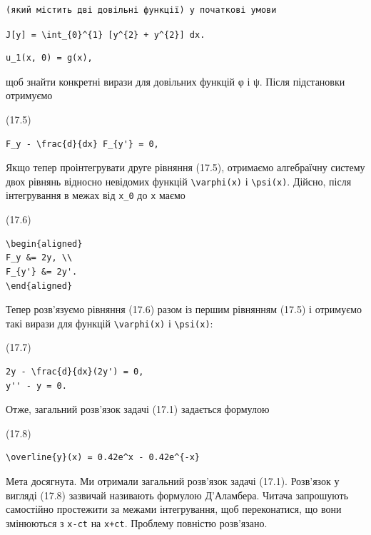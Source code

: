\documentclass[
  ukrainian,
]{article}
\begin{document}
\begin{verbatim}
(який містить дві довільні функції) у початкові умови
\end{verbatim}

\texttt{J{[}y{]}\ =\ \textbackslash{}int\_\{0\}\^{}\{1\}\ {[}y\^{}\{2\}\ +\ y\textquotesingle{}\^{}\{2\}{]}\ dx.}

\begin{verbatim}
u_1(x, 0) = g(x),
\end{verbatim}

щоб знайти конкретні вирази для довільних функцій φ і ψ. Після
підстановки отримуємо

(17.5)

\begin{verbatim}
F_y - \frac{d}{dx} F_{y'} = 0,
\end{verbatim}

Якщо тепер проінтегрувати друге рівняння (17.5), отримаємо алгебраїчну
систему двох рівнянь відносно невідомих функцій
\texttt{\textbackslash{}varphi(x)} і \texttt{\textbackslash{}psi(x)}.
Дійсно, після інтегрування в межах від \texttt{x\_0} до \texttt{x} маємо

(17.6)

\begin{verbatim}
\begin{aligned}
F_y &= 2y, \\
F_{y'} &= 2y'.
\end{aligned}
\end{verbatim}

Тепер розв'язуємо рівняння (17.6) разом із першим рівнянням (17.5) і
отримуємо такі вирази для функцій \texttt{\textbackslash{}varphi(x)} і
\texttt{\textbackslash{}psi(x)}:

(17.7)

\begin{verbatim}
2y - \frac{d}{dx}(2y') = 0,
y'' - y = 0.
\end{verbatim}

Отже, загальний розв'язок задачі (17.1) задається формулою

(17.8)

\begin{verbatim}
\overline{y}(x) = 0.42e^x - 0.42e^{-x}
\end{verbatim}

Мета досягнута. Ми отримали загальний розв'язок задачі (17.1). Розв'язок
у вигляді (17.8) зазвичай називають формулою Д'Аламбера. Читача
запрошують самостійно простежити за межами інтегрування, щоб
переконатися, що вони змінюються з \texttt{x-ct} на \texttt{x+ct}.
Проблему повністю розв'язано.
\end{document}
